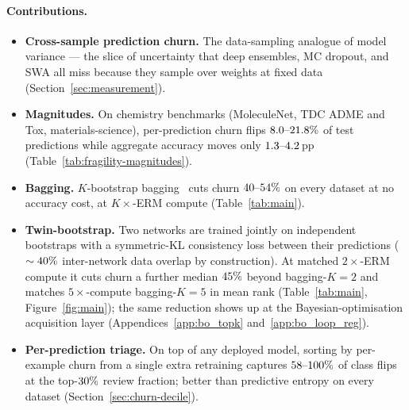 \paragraph{Contributions.}
\begin{itemize}\itemsep0pt
  \item \textbf{Cross-sample prediction churn.}  The data-sampling
        analogue of model variance --- the slice of uncertainty that
        deep ensembles, MC dropout, and SWA all miss because they
        sample over weights at fixed data
        (Section~\ref{sec:measurement}).
  \item \textbf{Magnitudes.}  On \nDatasetsHeadline{} chemistry
        benchmarks (MoleculeNet, TDC ADME and Tox, materials-science),
        per-prediction churn flips
        $8.0\text{--}21.8\%$ of test predictions while
        aggregate accuracy moves only
        $1.3\text{--}4.2$\,pp
        (Table~\ref{tab:fragility-magnitudes}).
  \item \textbf{Bagging.}  $K$-bootstrap bagging~\citep{Breiman1996}
        cuts churn $40\text{--}54\%$ on every
        dataset at no accuracy cost, at $K\times$-ERM compute
        (Table~\ref{tab:main}).
  \item \textbf{Twin-bootstrap.}  Two networks are trained jointly
        on independent bootstraps with a symmetric-KL consistency
        loss between their predictions ($\sim40\%$
        inter-network data overlap by construction).  At matched
        $2\times$-ERM compute it cuts churn a further median
        $45\%$ beyond bagging-$K{=}2$
        and matches $5\times$-compute bagging-$K{=}5$ in mean rank
        (Table~\ref{tab:main}, Figure~\ref{fig:main}); the same
        reduction shows up at the Bayesian-optimisation acquisition
        layer (Appendices~\ref{app:bo_topk} and~\ref{app:bo_loop_reg}).
  \item \textbf{Per-prediction triage.}  On top of any deployed
        model, sorting by per-example churn from a single extra
        retraining captures
        $58\text{--}100\%$ of class flips at
        the top-$30\%$ review fraction; better than
        predictive entropy on every dataset
        (Section~\ref{sec:churn-decile}).
\end{itemize}

